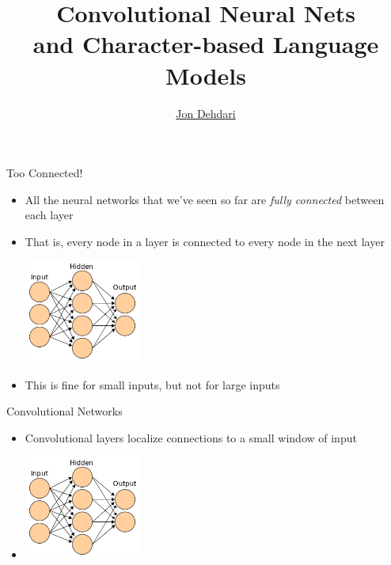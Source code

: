 \documentclass[xcolor=pdftex,x11names,table,hyperref]{beamer}
\newcommand{\Conv}{Convolutional}
\begin{document}
\title{\Conv{} Neural Nets \\[1.5em]
 \small{and Character-based Language Models} \\[1.0em]
 }
\author{\href{http://jon.dehdari.org}{Jon Dehdari}}
\frame{\titlepage}


\begin{frame}{Too Connected!}
\begin{itemize}
	\item All the neural networks that we've seen so far are \emph{fully connected} between each layer
	\item That is, every node in a layer is connected to every node in the next layer
	\begin{center}
	\includegraphics[width=0.3\textwidth]{images/wp_artificial_neural_network.png}
	\end{center}
	\pause
	\item This is fine for small inputs, but not for large inputs
\end{itemize}
\end{frame}


\begin{frame}{\Conv{} Networks}
\begin{itemize}
	\item Convolutional layers localize connections to a small window of input
	\item 
	\begin{center}
	\includegraphics[width=0.3\textwidth]{images/wp_artificial_neural_network.png}
	\end{center}
\end{itemize}
\end{frame}
\end{document}
